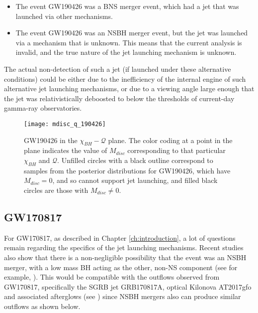         \begin{itemize}

            \item The event GW190426 was a BNS merger event, which had a jet that was
                launched via other mechanisms.

            \item The event GW190426 was an NSBH merger event, but the jet was launched
                via a mechanism that is unknown. This means that the current analysis is
                invalid, and the true nature of the jet launching mechanism is unknown.

        \end{itemize}

        The actual non-detection of such a jet (if launched under these alternative
        conditions) could be either due to the inefficiency of the internal engine of
        such alternative jet launching mechanisms, or due to a viewing angle large
        enough that the jet was relativistically deboosted to below the thresholds of
        current-day gamma-ray observatories.

        \begin{figure}[H]
            \centering
            \texttt{[image: mdisc\_q\_190426]}
            \caption[GW190426 in the $\chi_{BH}-\mathcal{Q}$ plane]
            {
                GW190426 in the $\chi_{BH}-\mathcal{Q}$ plane. The color coding at a
                point in the plane indicates the value of $M_{disc}$
                corresponding to that particular $\chi_{BH}$ and $\mathcal{Q}$.
                Unfilled circles with a black outline correspond to samples from the
                posterior distributions for GW190426, which have $M_{disc} =
                0$, and so cannot support jet launching, and filled black circles are
                those with $M_{disc} \neq 0$.
            }
            \label{fig:mdisc_q_190426}
        \end{figure}

    \subsection{GW170817}

        For GW170817, as described in Chapter \ref{ch:introduction}, a lot of questions
        remain regarding the specifics of the jet launching mechanisms. Recent studies
        also show that there is a non-negligible possibility that the event was an NSBH
        merger, with a low mass BH acting as the other, non-NS component (see for
        example, \cite{hinderer_2019}). This would be compatible with the outflows
        observed from GW170817, specifically the SGRB jet GRB170817A, optical Kilonova
        AT2017gfo and associated afterglows (see \cite{abbott_2017}) since NSBH mergers
        also can produce similar outflows as shown below.

